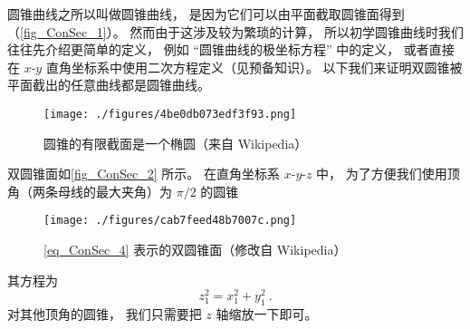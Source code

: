 

圆锥曲线之所以叫做圆锥曲线， 是因为它们可以由平面截取圆锥面得到（\autoref{fig_ConSec_1}）。 然而由于这涉及较为繁琐的计算， 所以初学圆锥曲线时我们往往先介绍更简单的定义， 例如 “圆锥曲线的极坐标方程” 中的定义， 或者直接在 $x$-$y$ 直角坐标系中使用二次方程定义（见预备知识）。 以下我们来证明双圆锥被平面截出的任意曲线都是圆锥曲线。

\begin{figure}[ht]
\centering
\texttt{[image: ./figures/4be0db073edf3f93.png]}
\caption{圆锥的有限截面是一个椭圆（来自 Wikipedia）} \label{fig_ConSec_1}
\end{figure}

双圆锥面如\autoref{fig_ConSec_2} 所示。 在直角坐标系 $x$-$y$-$z$ 中， 为了方便我们使用顶角（两条母线的最大夹角）为 $\pi/2$ 的圆锥
\begin{figure}[ht]
\centering
\texttt{[image: ./figures/cab7feed48b7007c.png]}
\caption{\autoref{eq_ConSec_4} 表示的双圆锥面（修改自 Wikipedia）} \label{fig_ConSec_2}
\end{figure}
其方程为
\begin{equation}\label{eq_ConSec_4}
z_1^2 = x_1^2 + y_1^2~.
\end{equation}
对其他顶角的圆锥， 我们只需要把 $z$ 轴缩放一下即可。

